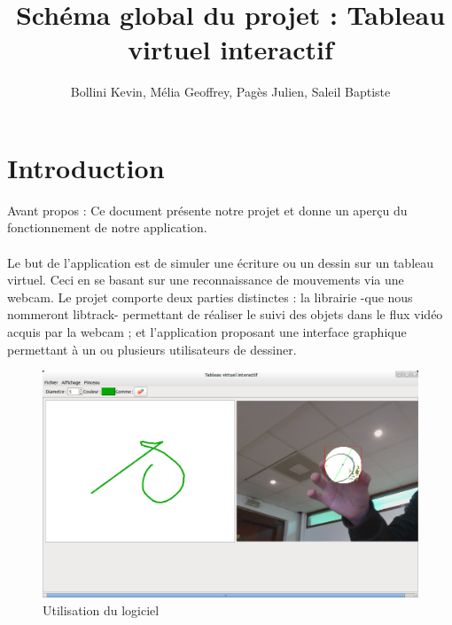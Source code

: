 \documentclass{article}
\title{Schéma global du projet : Tableau virtuel interactif}
\author{Bollini Kevin, Mélia Geoffrey, Pagès Julien, Saleil Baptiste}
\begin{document}
\maketitle

\section{Introduction}
Avant propos : Ce document présente notre projet et donne un aperçu du fonctionnement de notre application.
\paragraph{}
Le but de l’application est de simuler une écriture ou un dessin sur un tableau virtuel. Ceci en se basant sur une
reconnaissance de mouvements via une webcam. Le projet comporte deux parties distinctes : 
la librairie -que nous nommeront libtrack- permettant de réaliser le suivi des objets dans le flux vidéo acquis par la webcam ; et l'application proposant une interface graphique permettant à un ou plusieurs utilisateurs de dessiner.

\begin{figure}[h]
\begin{center}
	\includegraphics[scale=0.4]{capture.png}
	\caption{Utilisation du logiciel}
\end{center}
\end{figure}
\end{document}
